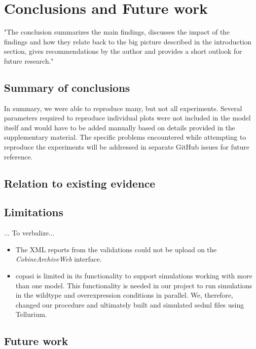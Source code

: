 \section*{Conclusions and Future work}

"The conclusion summarizes the main findings, discusses the impact of the findings and
how they relate back to the big picture described in the introduction section, gives
recommendations by the author and provides a short outlook for future research."

\subsection*{Summary of conclusions}
In summary, we were able to reproduce many, but not all experiments. Several parameters required to reproduce individual plots were not included in the model itself and would have to be added manually based on details provided in the supplementary material. The specific problems encountered while attempting to reproduce the experiments will be addressed in separate GitHub issues for future reference. 

\subsection*{Relation to existing evidence}

\subsection*{Limitations}
... To verbalize...
\begin{itemize}
    \item The XML reports from the validations could not be upload on the \textit{CobineArchiveWeb} interface.
    \item \ac{copasi} is limited in its functionality to support simulations working with more than one model. This functionality is needed in our project to run simulations in the wildtype and overexpression conditions in parallel. We, therefore, changed our procedure and ultimately built and simulated \ac{sedml} files using Tellurium.
\end{itemize}


\subsection*{Future work}

